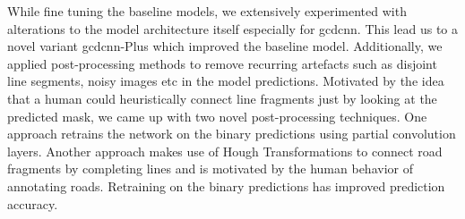 While fine tuning the baseline models, we extensively experimented with alterations to the model architecture itself especially for \acrshort{gcdcnn}. This lead us to a novel variant \acrshort{gcdcnn}-Plus which improved the baseline model. Additionally, we applied post-processing methods to remove recurring artefacts such as disjoint line segments, noisy images etc in the model predictions. Motivated by the idea that a human could heuristically connect line fragments just by looking at the predicted mask, we came up with two novel post-processing techniques.
One approach retrains the network on the binary predictions using partial convolution layers. Another approach makes use of Hough Transformations \cite{hough} to connect road fragments by completing lines and is motivated by the human behavior of annotating roads. Retraining on the binary predictions has improved prediction accuracy.

